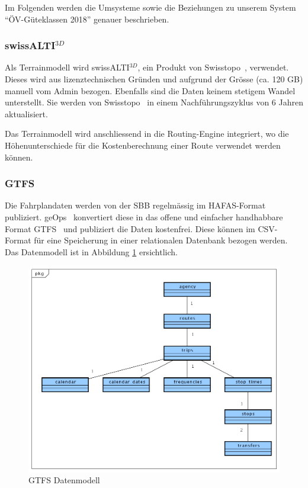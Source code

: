 Im Folgenden werden die Umsysteme sowie die Beziehungen zu unserem System "`ÖV-Güteklassen 2018"' genauer beschrieben.

\subsubsection{swissALTI$^{3D}$}
\label{subsystem:swissALTI3D}

Als \gls{Terrainmodell} wird swissALTI$^{3D}$, ein Produkt von Swisstopo~\cite{swissalti3d_swisstopo}, verwendet.
Dieses wird aus lizenztechnischen Gründen und aufgrund der Grösse (ca. 120 GB) manuell vom Admin bezogen.
Ebenfalls sind die Daten keinem stetigem Wandel unterstellt.
Sie werden von Swisstopo~\cite{swissalti3d_swisstopo} in einem Nachführungszyklus von 6 Jahren aktualisiert.

Das \gls{Terrainmodell} wird anschliessend in die \gls{Routing-Engine} integriert, wo die Höhenunterschiede für die Kostenberechnung einer Route verwendet werden können.

\subsubsection{GTFS}
\label{subsystem:GTFS}

Die Fahrplandaten werden von der SBB regelmässig im HAFAS-Format~\cite{sbb_hafas_spec} publiziert.
geOps~\cite{geops_fahrplandaten} konvertiert diese in das offene und einfacher handhabbare Format \ac{GTFS}~\cite{gtfs_spec} und publiziert die Daten kostenfrei.
Diese können im CSV-Format für eine Speicherung in einer relationalen Datenbank bezogen werden.
Das Datenmodell ist in Abbildung \ref{fig:GTFS_data_model} ersichtlich.

\begin{figure}[ht]
    \centering
    \includegraphics[width=1.0\linewidth]{projectdoc/img/GTFS_data_model}
    \caption[GTFS Datenmodell]{GTFS Datenmodell}
    \label{fig:GTFS_data_model}
\end{figure}

